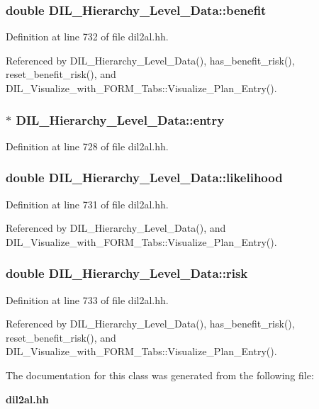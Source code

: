 \subsubsection{\setlength{\rightskip}{0pt plus 5cm}double DIL\_\-Hierarchy\_\-Level\_\-Data::benefit}\label{classDIL__Hierarchy__Level__Data_m1}




Definition at line 732 of file dil2al.hh.

Referenced by DIL\_\-Hierarchy\_\-Level\_\-Data(), has\_\-benefit\_\-risk(), reset\_\-benefit\_\-risk(), and DIL\_\-Visualize\_\-with\_\-FORM\_\-Tabs::Visualize\_\-Plan\_\-Entry().
\subsubsection{$\ast$ DIL\_\-Hierarchy\_\-Level\_\-Data::entry\hspace{0.3cm}{\tt  [protected]}}\label{classDIL__Hierarchy__Level__Data_n0}




Definition at line 728 of file dil2al.hh.
\subsubsection{\setlength{\rightskip}{0pt plus 5cm}double DIL\_\-Hierarchy\_\-Level\_\-Data::likelihood}\label{classDIL__Hierarchy__Level__Data_m0}




Definition at line 731 of file dil2al.hh.

Referenced by DIL\_\-Hierarchy\_\-Level\_\-Data(), and DIL\_\-Visualize\_\-with\_\-FORM\_\-Tabs::Visualize\_\-Plan\_\-Entry().
\subsubsection{\setlength{\rightskip}{0pt plus 5cm}double DIL\_\-Hierarchy\_\-Level\_\-Data::risk}\label{classDIL__Hierarchy__Level__Data_m2}




Definition at line 733 of file dil2al.hh.

Referenced by DIL\_\-Hierarchy\_\-Level\_\-Data(), has\_\-benefit\_\-risk(), reset\_\-benefit\_\-risk(), and DIL\_\-Visualize\_\-with\_\-FORM\_\-Tabs::Visualize\_\-Plan\_\-Entry().

The documentation for this class was generated from the following file:\begin{CompactItemize}
\item 
{\bf dil2al.hh}\end{CompactItemize}
